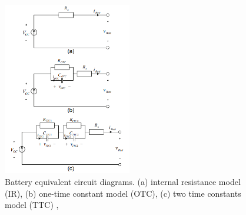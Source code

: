 \begin{figure}[h]
	\centering
	\includegraphics[width=0.5\textwidth]{Chap06/Figures/Batt_Ckt.PNG}
	\caption{Battery equivalent circuit diagrams. (a) internal resistance 
    model (IR), (b) one-time constant model (OTC), (c) two time 
    constants model (TTC) \cite{UKEMPT_AHMAD2012},\cite{UKEMPT_AHMAD2012} }
	\label{fig:Battery_Equivalent_circuit}
\end{figure}

